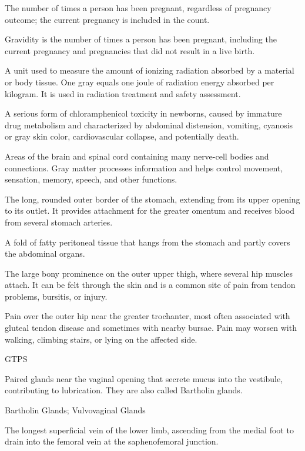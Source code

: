  The number of times a person has been pregnant, regardless of pregnancy outcome; the current pregnancy is included in the count.

 Gravidity is the number of times a person has been pregnant, including the current pregnancy and pregnancies that did not result in a live birth.

 A unit used to measure the amount of ionizing radiation absorbed by a material or body tissue. One gray equals one joule of radiation energy absorbed per kilogram. It is used in radiation treatment and safety assessment.

 A serious form of chloramphenicol toxicity in newborns, caused by immature drug metabolism and characterized by abdominal distension, vomiting, cyanosis or gray skin color, cardiovascular collapse, and potentially death.

 Areas of the brain and spinal cord containing many nerve-cell bodies and connections. Gray matter processes information and helps control movement, sensation, memory, speech, and other functions.

 The long, rounded outer border of the stomach, extending from its upper opening to its outlet. It provides attachment for the greater omentum and receives blood from several stomach arteries.

 A fold of fatty peritoneal tissue that hangs from the stomach and partly covers the abdominal organs.

 The large bony prominence on the outer upper thigh, where several hip muscles attach. It can be felt through the skin and is a common site of pain from tendon problems, bursitis, or injury.

 Pain over the outer hip near the greater trochanter, most often associated with gluteal tendon disease and sometimes with nearby bursae. Pain may worsen with walking, climbing stairs, or lying on the affected side.

\synonyms
GTPS

 Paired glands near the vaginal opening that secrete mucus into the vestibule, contributing to lubrication. They are also called Bartholin glands.

\synonyms
Bartholin Glands; Vulvovaginal Glands

 The longest superficial vein of the lower limb, ascending from the medial foot to drain into the femoral vein at the saphenofemoral junction.

